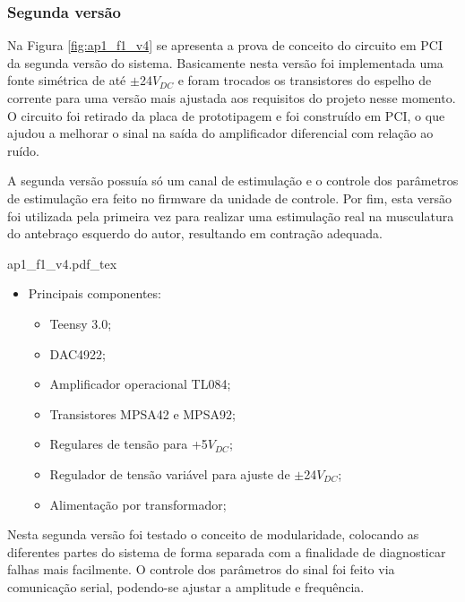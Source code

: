 \subsubsection*{Segunda versão}
Na Figura \ref{fig:ap1_f1_v4} se apresenta a prova de conceito do circuito em PCI da segunda versão do sistema. Basicamente nesta versão foi implementada uma fonte simétrica de até $\mathrm{\pm}$24$V_{DC}$ e foram trocados os transistores do espelho de corrente para uma versão mais ajustada aos requisitos do projeto nesse momento. O circuito foi retirado da placa de prototipagem e foi construído em \acrshort{PCI}, o que ajudou a melhorar o sinal na saída do amplificador diferencial com relação ao ruído. 

A segunda versão possuía só um canal de estimulação e o controle dos parâmetros de estimulação era feito no firmware da unidade de controle. Por fim, esta versão foi utilizada pela primeira vez para realizar uma estimulação real na musculatura do antebraço esquerdo do autor, resultando em contração adequada. 

\begin{figure*}[h]
    \centering %
    \small %
    \def\svgwidth{0.9\columnwidth}%
    {ap1_f1_v4.pdf_tex}
    \caption{PCIs da segunda versão do sistema.}
    \label{fig:ap1_f1_v4}
\end{figure*}

\begin{itemize}
    \item Principais componentes:
    \begin{itemize}
        \item Teensy 3.0;
        \item DAC4922;
        \item Amplificador operacional TL084;
        \item Transistores MPSA42 e MPSA92;
        \item Regulares de tensão para +5$V_{DC}$; 
        \item Regulador de tensão variável para ajuste de $\mathrm{\pm}$24$V_{DC}$;
        \item Alimentação por transformador;
    \end{itemize}
\end{itemize}

Nesta segunda versão foi testado o conceito de modularidade, colocando as diferentes partes do sistema de forma separada com a finalidade de diagnosticar falhas mais facilmente. O controle dos parâmetros do sinal foi feito via comunicação serial, podendo-se ajustar a amplitude e frequência. 

